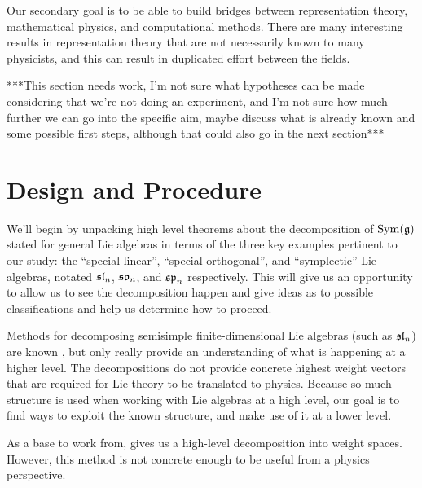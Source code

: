 \documentclass[11pt, reqno]{amsart}
\begin{document}
Our secondary goal is to be able to build bridges between representation theory, mathematical physics, and computational methods. There are many interesting results in representation theory that are not necessarily known to many physicists, and this can result in duplicated effort between the fields.




***This section needs work, I'm not sure what hypotheses can be made considering that we're not doing an experiment, and I'm not sure how much further we can go into the specific aim, maybe discuss what is already known and some possible first steps, although that could also go in the next section***

\section{Design and Procedure}

We'll begin by unpacking high level theorems about the decomposition of $\operatorname{Sym}(\mathfrak{g})$ stated for general Lie algebras in terms of the three key examples pertinent to our study: the ``special linear'', ``special orthogonal'', and ``symplectic'' Lie algebras, notated $\mathfrak{sl}_n$, $\mathfrak{so}_n$, and $\mathfrak{sp}_n$ respectively. This will give us an opportunity to allow us to see the decomposition happen and give ideas as to possible classifications and help us determine how to proceed.

Methods for decomposing semisimple finite-dimensional Lie algebras (such as $\mathfrak{sl}_n$) are known \cite{Dau14}, but only really provide an understanding of what is happening at a higher level. The decompositions do not provide concrete highest weight vectors that are required for Lie theory to be translated to physics. Because so much structure is used when working with Lie algebras at a high level, our goal is to find ways to exploit the known structure, and make use of it at a lower level.

As a base to work from, \cite{Dau14} gives us a high-level decomposition into weight spaces. However, this method is not concrete enough to be useful from a physics perspective.
\end{document}
